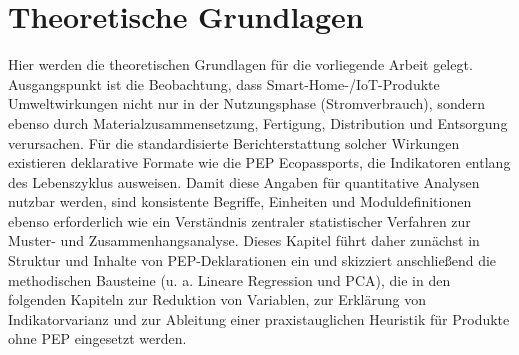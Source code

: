 \chapter{Theoretische Grundlagen}

Hier werden die theoretischen Grundlagen für die vorliegende Arbeit gelegt. 
Ausgangspunkt ist die Beobachtung, dass Smart-Home-/IoT-Produkte Umweltwirkungen nicht nur in der Nutzungsphase (Stromverbrauch), 
sondern ebenso durch Materialzusammensetzung, Fertigung, Distribution und Entsorgung verursachen. 
Für die standardisierte Berichterstattung solcher Wirkungen existieren deklarative Formate wie die PEP Ecopassports, 
die Indikatoren entlang des Lebenszyklus ausweisen. Damit diese Angaben für quantitative Analysen nutzbar werden, 
sind konsistente Begriffe, Einheiten und Moduldefinitionen ebenso erforderlich wie ein Verständnis zentraler 
statistischer Verfahren zur Muster- und Zusammenhangsanalyse. Dieses Kapitel führt daher zunächst in Struktur 
und Inhalte von PEP-Deklarationen ein und skizziert anschließend die methodischen Bausteine 
(u. a. Lineare Regression und PCA), die in den folgenden Kapiteln zur Reduktion von Variablen, 
zur Erklärung von Indikatorvarianz und zur Ableitung einer praxistauglichen Heuristik für Produkte ohne PEP eingesetzt werden.





% 


